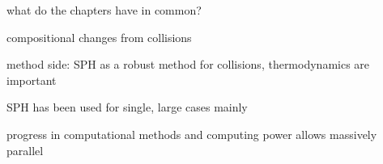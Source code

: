 what do the chapters have in common?

compositional changes from collisions

method side: SPH as a robust method for collisions, thermodynamics are important

SPH has been used for single, large cases mainly \cite{2005Natur.435..629S}

progress in computational methods and computing power allows massively parallel 









